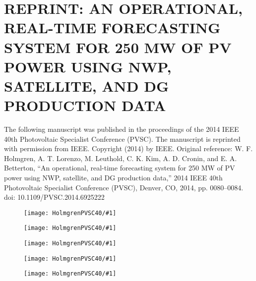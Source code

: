 \chapter{REPRINT: AN OPERATIONAL, REAL-TIME FORECASTING SYSTEM FOR 250
  MW OF PV POWER USING NWP, SATELLITE, AND DG PRODUCTION DATA}
\label{app:wfhpvsc}
The following manuscript was published in the proceedings of the 2014
IEEE 40th Photovoltaic Specialist Conference (PVSC).
The manuscript is reprinted with permission from IEEE.
Copyright (2014) by IEEE.
Original reference: W. F. Holmgren, A. T. Lorenzo, M. Leuthold,
C. K. Kim, A. D. Cronin, and E. A. Betterton, ``An operational,
real-time forecasting system for 250 MW of PV power using NWP,
satellite, and DG production data,'' 2014 IEEE 40th Photovoltaic
Specialist Conference (PVSC), Denver, CO, 2014, pp. 0080--0084. doi:
10.1109/PVSC.2014.6925222


\newcommand{\figWPV}[1]{
\begin{figure}
\texttt{[image: HolmgrenPVSC40/\#1]}
\end{figure}
}


\figWPV{pg1}
\figWPV{pg2}
\figWPV{pg3}
\figWPV{pg4}
\figWPV{pg5}


